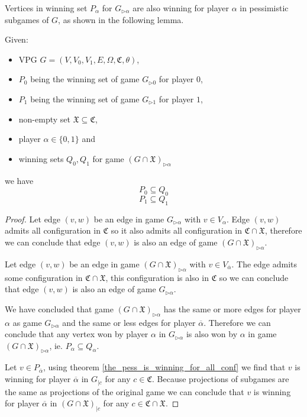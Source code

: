 Vertices in winning set $P_\alpha$ for $G_{\triangleright\alpha}$ are also winning for player $\alpha$ in pessimistic subgames of $G$, as shown in the following lemma.
\begin{lemma}
	\label{lem_pessimistic_subgames}
	Given:
	\begin{itemize}
		\item VPG $G = (V,V_0,V_1,E,\Omega, \mathfrak{C},\theta)$,
		\item $P_0$ being the winning set of game $G_{\triangleright0}$ for player $0$,
		\item $P_1$ being the winning set of game $G_{\triangleright1}$ for player $1$,
		\item non-empty set $\mathfrak{X} \subseteq \mathfrak{C}$,
		\item player $\alpha \in \{0,1\}$ and
		\item winning sets $Q_0,Q_1$ for game $(G \cap \mathfrak{X})_{\triangleright\alpha}$
	\end{itemize}
	we have
	\[ P_0 \subseteq Q_0 \]
	\[ P_1 \subseteq Q_1 \]
	\begin{proof}
	
		Let edge $(v,w)$ be an edge in game $G_{\triangleright\alpha}$ with $v \in V_\alpha$. Edge $(v,w)$ admits all configuration in $\mathfrak{C}$ so it also admits all configuration in $\mathfrak{C} \cap \mathfrak{X}$, therefore we can conclude that edge $(v,w)$ is also an edge of game $(G\cap \mathfrak{X})_{\triangleright\alpha}$.
		
		Let edge $(v,w)$ be an edge in game $(G \cap \mathfrak{X})_{\triangleright\alpha}$ with $v \in V_{\overline{\alpha}}$. The edge admits some configuration in $\mathfrak{C} \cap \mathfrak{X}$, this configuration is also in $\mathfrak{C}$ so we can conclude that edge $(v,w)$ is also an edge of game $G_{\triangleright\alpha}$.
		
		We have concluded that game $(G \cap \mathfrak{X})_{\triangleright\alpha}$ has the same or more edges for player $\alpha$ as game $G_{\triangleright\alpha}$ and the same or less edges for player $\overline{\alpha}$. Therefore we can conclude that any vertex won by player $\alpha$ in $G_{\triangleright\alpha}$ is also won by $\alpha$ in game $(G \cap \mathfrak{X})_{\triangleright\alpha}$, ie. $P_\alpha \subseteq Q_\alpha$.
		
		
		Let $v \in P_{\overline{\alpha}}$, using theorem \ref{the_pess_is_winning_for_all_conf} we find that $v$ is winning for player $\overline{\alpha}$ in $G_{|c}$ for any $c \in \mathfrak{C}$. Because projections of subgames are the same as projections of the original game we can conclude that $v$ is winning for player $\overline{\alpha}$ in $(G \cap \mathfrak{X})_{|c}$ for any $c \in \mathfrak{C} \cap \mathfrak{X}$.
		

\end{proof}
\end{lemma}
